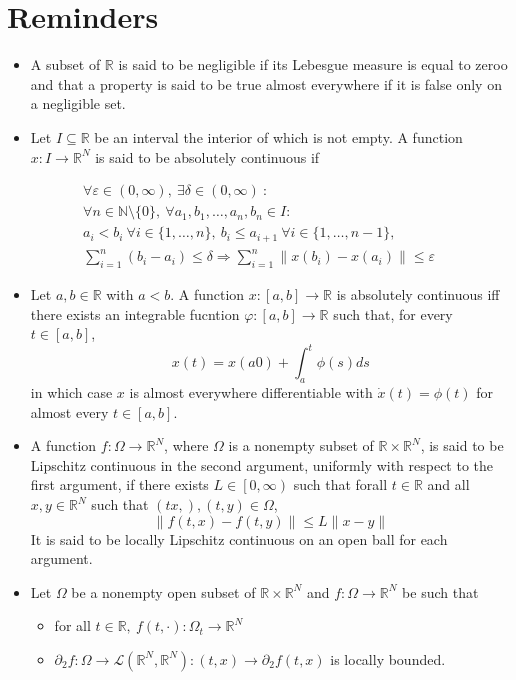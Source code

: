 \documentclass[12pt, openany]{report}
\theoremstyle{definition}
\newcommand{\R}{\mathbb{R}}
\begin{document}
\section{Reminders}
\begin{itemize}
    \item A subset of \(\R\) is said to be negligible if its Lebesgue measure is equal to zeroo and that a property is said to be true almost everywhere if it is false only on a negligible set. 
    \item Let \(I\subseteq \R\) be an interval the interior of which is not empty. A function \(x:I\rightarrow \R^N\) is said to be absolutely continuous if 
\end{itemize}
\begin{multline*}
        \forall \varepsilon \in (0,\infty),\: \exists \delta\in (0,\infty) \: : \\
        \forall n\in \mathbb{N}\setminus\{0\},\: \forall a_1,b_1,\dots, a_n,b_n\in I : \\ 
        a_i<b_i \: \forall i\in \{1,\dots,n\}, \: b_i\le a_{i+1} \:\forall i\in \{1,\dots,n-1\}, \\
        \sum_{i=1}^n(b_i-a_i)\le \delta \Longrightarrow \sum_{i=1}^n \lVert x(b_i)-x(a_i)\rVert \le \varepsilon
\end{multline*}
\begin{itemize}
    \item Let \(a,b\in \R\) with \(a<b\). A function \(x:[a,b]\rightarrow \R\) is absolutely continuous iff there exists an integrable fucntion \(\varphi:[a,b]\rightarrow \R\) such that, for every \(t\in [a,b]\), \[x(t) = x(a0) + \int_a^t \phi(s)ds\] in which case \(x\) is almost everywhere differentiable with \(\dot x(t) = \phi(t)\) for almost every \(t\in [a,b]\). 
    \item A function \(f:\Omega\rightarrow \R^N\), where \(\Omega\) is a nonempty subset of \(\R\times \R^N\), is said to be Lipschitz continuous in the second argument, uniformly with respect to the first argument, if there exists \(L\in \left[0,\infty\right)\) such that forall \(t\in \R\) and all \(x,y\in \R^N\) such that \((tx,),(t,y)\in \Omega\), \[\lVert f(t,x)-f(t,y)\rVert \le L\lVert x-y\rVert\] It is said to be locally Lipschitz continuous on an open ball for each argument. 
    \item Let \(\Omega\) be a nonempty open subset of \(\R\times \R^N\) and \(f:\Omega\rightarrow \R^N\) be such that 
    \begin{itemize}
        \item for all \(t\in \R,\: f(t,\cdot):\Omega_t\rightarrow \R^N\)
        \item \(\partial_2f:\Omega \rightarrow \mathcal{L}(\R^N,\R^N):(t,x)\rightarrow \partial_2f(t,x)\) is locally bounded.
    \end{itemize}
\end{itemize}
\end{document}
